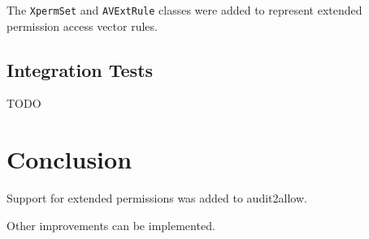 The \texttt{XpermSet} and \texttt{AVExtRule} classes were added to represent
extended permission access vector rules.

\section{Integration Tests}

TODO

\chapter{Conclusion}



Support for extended permissions was added to audit2allow.

Other improvements can be implemented.
